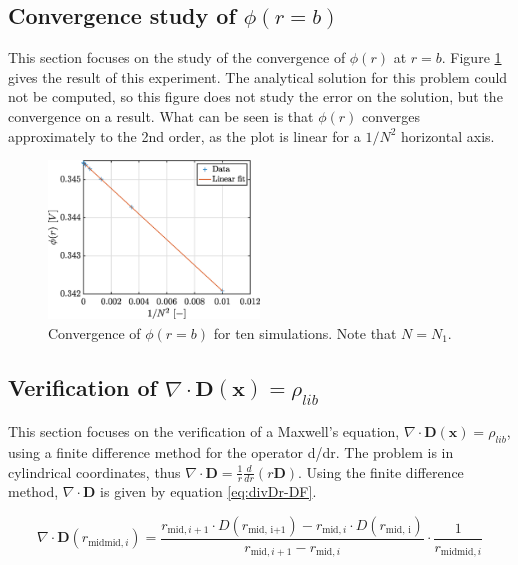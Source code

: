\documentclass[a4paper,12pt,twoside]{article}
\newcommand{\mbf}[1]{\mathbf{#1}} %
\newcommand{\Div}[1]{\nabla\cdot\mathbf{#1}}
\newcommand{\bracket}[1]{\left(#1\right)}
\begin{document}
  \subsection{Convergence study of $\phi\bracket{r=b}$}
  This section focuses on the study of the convergence of $\phi\bracket{r}$ at $r=b$.
  Figure \ref{fig:d1-conv} gives the result of this experiment.
  The analytical solution for this problem could not be computed, so this figure does not study the error on the solution, but the convergence on a result.
  What can be seen is that $\phi\bracket{r}$ converges approximately to the 2nd order, as the plot is linear for a $1/N^2$ horizontal axis.

  \begin{figure}[h]
    \centering
    \includegraphics[width=0.5\textwidth]{graphs/exd1-convPhi.eps}
    \caption{Convergence of $\phi\bracket{r=b}$ for ten simulations. Note that $N=N_1$.}
    \label{fig:d1-conv}
  \end{figure}

  \subsection{Verification of $\Div{\mbf{D}\bracket{\mbf{x}}} = \rho_{lib}$}
  This section focuses on the verification of a Maxwell's equation, $\Div{D}\bracket{\mbf{x}} = \rho_{lib}$, using a finite difference method for the operator d/dr.
  The problem is in cylindrical coordinates, thus $\Div{D} = \frac{1}{r}\frac{d}{dr}\bracket{r\mbf{D}}$.
  Using the finite difference method, $\Div{D}$ is given by equation \eqref{eq:divDr-DF}.

  \begin{equation}
    \Div{D}\bracket{r_{\text{midmid},i}} = \frac{r_{\text{mid},i+1}\cdot D\bracket{r_\text{mid, i+1}} - r_{\text{mid},i}\cdot D\bracket{r_\text{mid, i}}}{r_{\text{mid},i+1} - r_{\text{mid},i}}\cdot\frac{1}{r_{\text{midmid},i}}
    \label{eq:divDr-DF}
  \end{equation}
\end{document}
